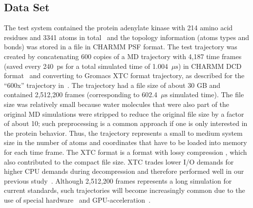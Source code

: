 \subsection{Data Set}
\label{sec:data}

The test system contained the protein adenylate kinase with 214 amino acid residues and 3341 atoms in total~\cite{Seyler:2014il} and the topology information (atoms types and bonds) was stored in a file in CHARMM PSF format.
The test trajectory was created by concatenating 600 copies of a MD trajectory with 4,187 time frames (saved every 240~ps for a total simulated time of 1.004~$\mu\text{s}$) in CHARMM DCD format~\cite{Seyler:2017aa} and converting to Gromacs XTC format trajectory, as described for the ``600x'' trajectory in~\citet{Khoshlessan:2017ab}.
The trajectory had a file size of about 30 GB and contained 2,512,200 frames (corresponding to 602.4~$\mu\text{s}$ simulated time).
The file size was relatively small because water molecules that were also part of the original MD simulations were stripped to reduce the original file size by a factor of about 10; such preprocessing is a common approach if one is only interested in the protein behavior.
Thus, the trajectory represents a small to medium system size in the number of atoms and coordinates that have to be loaded into memory for each time frame.
The XTC format is a format with lossy compression \cite{Lindahl01, Spangberg:2011zr}, which also contributed to the compact file size.
XTC trades lower I/O demands for higher CPU demands during decompression and therefore performed well in our previous study~\cite{Khoshlessan:2017ab}.
Although 2,512,200 frames represents a long simulation for current standards, such trajectories will become increasingly common due to the use of special hardware~\cite{Shaw:2009ly, Shaw:2014aa} and GPU-acceleration~\cite{Salomon-Ferrer:2013cr, Glaser:2015ys, Abraham:2015aa}.
